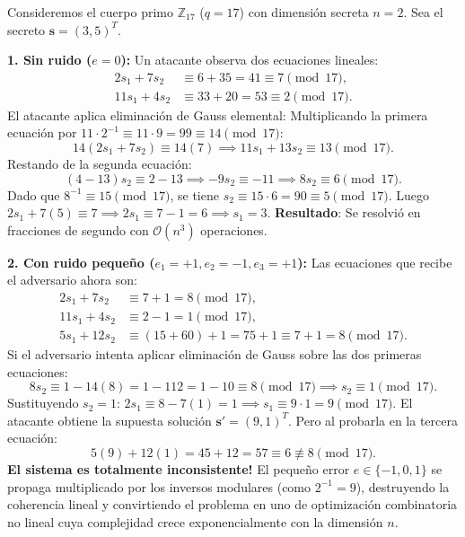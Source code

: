 \documentclass[11pt,a4paper,twoside,openright]{book}
\theoremstyle{plain}
\theoremstyle{definition}
\theoremstyle{remark}
\newcommand{\Z}{\mathbb{Z}}
\newcommand{\vv}[1]{\mathbf{#1}}
\begin{document}
\begin{ejemplopaso}
Consideremos el cuerpo primo $\Z_{17}$ ($q=17$) con dimensi\'on secreta $n=2$. Sea el secreto $\vv{s} = (3, 5)^T$.

\textbf{1. Sin ruido ($e=0$):} Un atacante observa dos ecuaciones lineales:
\begin{align*}
  2 s_1 + 7 s_2 &\equiv 6 + 35 = 41 \equiv 7 \pmod{17}, \\
  11 s_1 + 4 s_2 &\equiv 33 + 20 = 53 \equiv 2 \pmod{17}.
\end{align*}
El atacante aplica eliminaci\'on de Gauss elemental:
Multiplicando la primera ecuaci\'on por $11 \cdot 2^{-1} \equiv 11 \cdot 9 = 99 \equiv 14 \pmod{17}$:
\[
  14(2 s_1 + 7 s_2) \equiv 14(7) \implies 11 s_1 + 13 s_2 \equiv 13 \pmod{17}.
\]
Restando de la segunda ecuaci\'on:
\[
  (4 - 13) s_2 \equiv 2 - 13 \implies -9 s_2 \equiv -11 \implies 8 s_2 \equiv 6 \pmod{17}.
\]
Dado que $8^{-1} \equiv 15 \pmod{17}$, se tiene $s_2 \equiv 15 \cdot 6 = 90 \equiv 5 \pmod{17}$.
Luego $2 s_1 + 7(5) \equiv 7 \implies 2 s_1 \equiv 7 - 1 = 6 \implies s_1 = 3$.
\textbf{Resultado}: Se resolvi\'o en fracciones de segundo con $\mathcal{O}(n^3)$ operaciones.

\textbf{2. Con ruido peque\~no ($e_1 = +1, e_2 = -1, e_3 = +1$):}
Las ecuaciones que recibe el adversario ahora son:
\begin{align*}
  2 s_1 + 7 s_2 &\equiv 7 + 1 = 8 \pmod{17}, \\
  11 s_1 + 4 s_2 &\equiv 2 - 1 = 1 \pmod{17}, \\
  5 s_1 + 12 s_2 &\equiv (15 + 60) + 1 = 75 + 1 \equiv 7 + 1 = 8 \pmod{17}.
\end{align*}
Si el adversario intenta aplicar eliminaci\'on de Gauss sobre las dos primeras ecuaciones:
\[
  8 s_2 \equiv 1 - 14(8) = 1 - 112 = 1 - 10 \equiv 8 \pmod{17} \implies s_2 \equiv 1 \pmod{17}.
\]
Sustituyendo $s_2=1$: $2 s_1 \equiv 8 - 7(1) = 1 \implies s_1 \equiv 9 \cdot 1 = 9 \pmod{17}$.
El atacante obtiene la supuesta soluci\'on $\vv{s}' = (9, 1)^T$.
Pero al probarla en la tercera ecuaci\'on:
\[
  5(9) + 12(1) = 45 + 12 = 57 \equiv 6 \not\equiv 8 \pmod{17}.
\]
\textbf{El sistema es totalmente inconsistente!} 
El peque\~no error $e \in \{-1, 0, 1\}$ se propaga multiplicado por los inversos modulares (como $2^{-1} = 9$), destruyendo la coherencia lineal y convirtiendo el problema en uno de optimizaci\'on combinatoria no lineal cuya complejidad crece exponencialmente con la dimensi\'on $n$.
\end{ejemplopaso}
\end{document}
